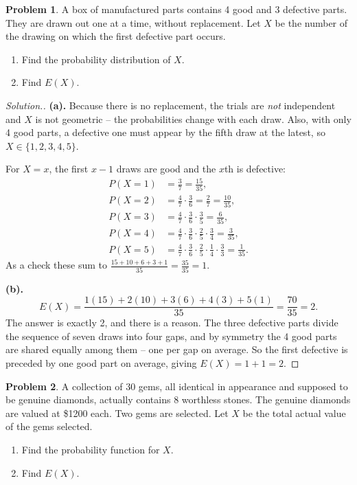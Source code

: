 \documentclass[12pt,a4paper]{report}
\theoremstyle{definition}
\theoremstyle{plain}
\theoremstyle{definition}
\newtheorem{problemx}{Problem}[section]
\newenvironment{problem}{\begin{problemx}}{\end{problemx}}
\newenvironment{solution}
  {\renewcommand{\qedsymbol}{}\begin{proof}[\textit{Solution}.]}
  {\end{proof}}
\begin{document}
\begin{problem}
A box of manufactured parts contains 4 good and 3 defective parts. They are drawn out one
at a time, without replacement. Let $X$ be the number of the drawing on which the first
defective part occurs.
\begin{enumerate}
\item[(a).] Find the probability distribution of $X$.
\item[(b).] Find $E(X)$.
\end{enumerate}
\end{problem}

\begin{solution}
\textbf{(a).} Because there is no replacement, the trials are \emph{not} independent and
$X$ is not geometric -- the probabilities change with each draw. Also, with only 4 good
parts, a defective one must appear by the fifth draw at the latest, so
$X\in\{1,2,3,4,5\}$.

For $X=x$, the first $x-1$ draws are good and the $x$th is defective:
\begin{align*}
P(X=1) &= \frac{3}{7} = \frac{15}{35},\\
P(X=2) &= \frac{4}{7}\cdot\frac{3}{6} = \frac{2}{7} = \frac{10}{35},\\
P(X=3) &= \frac{4}{7}\cdot\frac{3}{6}\cdot\frac{3}{5} = \frac{6}{35},\\
P(X=4) &= \frac{4}{7}\cdot\frac{3}{6}\cdot\frac{2}{5}\cdot\frac{3}{4} = \frac{3}{35},\\
P(X=5) &= \frac{4}{7}\cdot\frac{3}{6}\cdot\frac{2}{5}\cdot\frac{1}{4}\cdot\frac{3}{3}
 = \frac{1}{35}.
\end{align*}
As a check these sum to $\tfrac{15+10+6+3+1}{35} = \tfrac{35}{35} = 1$.

\textbf{(b).} \[E(X) = \frac{1(15)+2(10)+3(6)+4(3)+5(1)}{35} = \frac{70}{35} = 2.\]
The answer is exactly 2, and there is a reason. The three defective parts divide the
sequence of seven draws into four gaps, and by symmetry the 4 good parts are shared
equally among them -- one per gap on average. So the first defective is preceded by one
good part on average, giving $E(X) = 1+1 = 2$.
\end{solution}

\begin{problem}
A collection of 30 gems, all identical in appearance and supposed to be genuine diamonds,
actually contains 8 worthless stones. The genuine diamonds are valued at \$1200 each. Two
gems are selected. Let $X$ be the total actual value of the gems selected.
\begin{enumerate}
\item[(a).] Find the probability function for $X$.
\item[(b).] Find $E(X)$.
\end{enumerate}
\end{problem}
\end{document}
